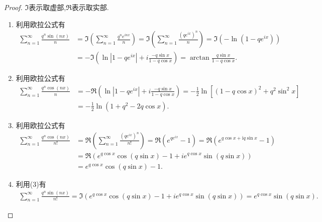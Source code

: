 \documentclass[../../main.tex]{subfiles}%
\begin{document}
\begin{proof}
$\Im$表示取虚部,$\Re$表示取实部.
\begin{enumerate}[(1)]
\item 利用欧拉公式有
\begin{align*}
\sum_{n = 1}^{\infty} \frac{q^{n} \sin(nx)}{n} &= \Im\left( \sum_{n = 1}^{\infty} \frac{q^{n} e^{inx}}{n} \right) = \Im\left( \sum_{n = 1}^{\infty} \frac{(q e^{ix})^{n}}{n} \right) = \Im(-\ln(1 - q e^{ix})) \\
&= -\Im\left( \ln|1 - q e^{ix}| + i \frac{-q \sin x}{1 - q \cos x} \right) = \arctan \frac{q \sin x}{1 - q \cos x}.
\end{align*}

\item 利用欧拉公式有
\begin{align*}
\sum_{n = 1}^{\infty} \frac{q^{n} \cos(nx)}{n} &= -\Re\left( \ln|1 - q e^{ix}| + i \frac{-q \sin x}{1 - q \cos x} \right) = -\frac{1}{2} \ln\left[(1 - q \cos x)^{2} + q^{2} \sin^{2} x\right] \\
&= -\frac{1}{2} \ln(1 + q^{2} - 2q \cos x).
\end{align*}

\item 利用欧拉公式有
\begin{align*}
\sum_{n = 1}^{\infty} \frac{q^{n} \cos(nx)}{n!} &= \Re\left( \sum_{n = 1}^{\infty} \frac{(q e^{ix})^{n}}{n!} \right) = \Re\left( e^{q e^{ix}} - 1 \right) =\Re \left( e^{q\cos x+\mathrm{i}q\sin x}-1 \right) 
\\
&= \Re\left( e^{q \cos x} \cos(q \sin x) - 1 + i e^{q \cos x} \sin(q \sin x) \right) \\
&= e^{q \cos x} \cos(q \sin x) - 1.
\end{align*}

\item 利用(3)有
\begin{align*}
\sum_{n = 1}^{\infty} \frac{q^{n} \sin(nx)}{n!} = \Im\left( e^{q \cos x} \cos(q \sin x) - 1 + i e^{q \cos x} \sin(q \sin x) \right) 
= e^{q \cos x} \sin(q \sin x).
\end{align*} 
\end{enumerate}
\end{proof}
\end{document}
